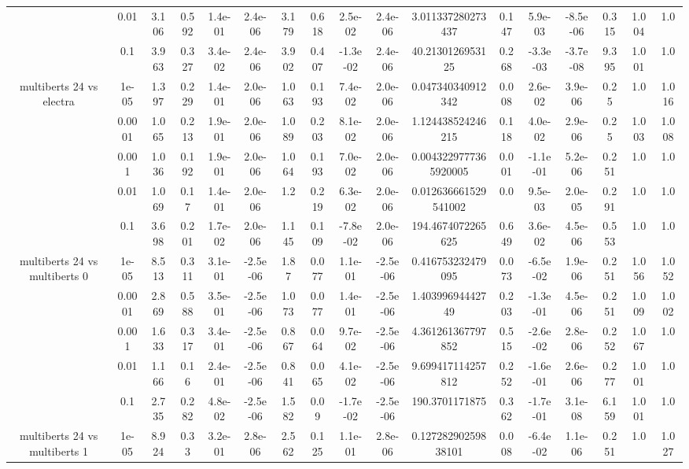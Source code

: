 \begin{tabular}{|c|c|c|c|c|c|c|c|c|c|c|c|c|c|c|c|c|}
 & 0.01 & 3.106 & 0.592 & 1.4e-01 & 2.4e-06 & 3.179 & 0.618 & 2.5e-02 & 2.4e-06 & 3.011337280273437 & 0.147 & 5.9e-03 & -8.5e-06 & 0.315 & 1.004 & 1.0 \\
 & 0.1 & 3.963 & 0.327 & 3.4e-02 & 2.4e-06 & 3.902 & 0.407 & -1.3e-02 & 2.4e-06 & 40.2130126953125 & 0.268 & -3.3e-03 & -3.7e-08 & 9.395 & 1.001 & 1.0 \\
\hline
\multirow{5}{*}{multiberts 24 vs electra } & 1e-05 & 1.397 & 0.229 & 1.4e-01 & 2.0e-06 & 1.063 & 0.193 & 7.4e-02 & 2.0e-06 & 0.047340340912342 & 0.008 & 2.6e-02 & 3.9e-06 & 0.25 & 1.0 & 1.016 \\
 & 0.0001 & 1.065 & 0.213 & 1.9e-01 & 2.0e-06 & 1.089 & 0.203 & 8.1e-02 & 2.0e-06 & 1.124438524246215 & 0.118 & 4.0e-02 & 2.9e-06 & 0.25 & 1.003 & 1.008 \\
 & 0.001 & 1.036 & 0.192 & 1.9e-01 & 2.0e-06 & 1.064 & 0.193 & 7.0e-02 & 2.0e-06 & 0.0043229777365920005 & 0.001 & -1.1e-01 & 5.2e-06 & 0.251 & 1.0 & 1.0 \\
 & 0.01 & 1.069 & 0.17 & 1.4e-01 & 2.0e-06 & 1.2 & 0.219 & 6.3e-02 & 2.0e-06 & 0.012636661529541002 & 0.0 & 9.5e-03 & 2.0e-05 & 0.291 & 1.0 & 1.0 \\
 & 0.1 & 3.698 & 0.201 & 1.7e-02 & 2.0e-06 & 1.145 & 0.109 & -7.8e-02 & 2.0e-06 & 194.4674072265625 & 0.649 & 3.6e-02 & 4.5e-06 & 0.553 & 1.0 & 1.0 \\
\hline
\multirow{5}{*}{multiberts 24 vs multiberts 0} & 1e-05 & 8.513 & 0.311 & 3.1e-01 & -2.5e-06 & 1.87 & 0.077 & 1.1e-01 & -2.5e-06 & 0.416753232479095 & 0.073 & -6.5e-02 & 1.9e-06 & 0.251 & 1.056 & 1.052 \\
 & 0.0001 & 2.869 & 0.588 & 3.5e-01 & -2.5e-06 & 1.073 & 0.077 & 1.4e-01 & -2.5e-06 & 1.40399694442749 & 0.203 & -1.3e-01 & 4.5e-06 & 0.251 & 1.009 & 1.002 \\
 & 0.001 & 1.633 & 0.317 & 3.4e-01 & -2.5e-06 & 0.867 & 0.064 & 9.7e-02 & -2.5e-06 & 4.361261367797852 & 0.515 & -2.6e-02 & 2.8e-06 & 0.252 & 1.067 & 1.0 \\
 & 0.01 & 1.166 & 0.16 & 2.4e-01 & -2.5e-06 & 0.841 & 0.065 & 4.1e-02 & -2.5e-06 & 9.699417114257812 & 0.252 & -1.6e-01 & 2.6e-06 & 0.277 & 1.001 & 1.0 \\
 & 0.1 & 2.735 & 0.282 & 4.8e-02 & -2.5e-06 & 1.582 & 0.09 & -1.7e-02 & -2.5e-06 & 190.3701171875 & 0.362 & -1.7e-01 & 3.1e-08 & 6.159 & 1.001 & 1.0 \\
\hline
\multirow{5}{*}{multiberts 24 vs multiberts 1} & 1e-05 & 8.924 & 0.33 & 3.2e-01 & 2.8e-06 & 2.562 & 0.125 & 1.1e-01 & 2.8e-06 & 0.12728290259838101 & 0.008 & -6.4e-02 & 1.1e-06 & 0.251 & 1.0 & 1.027 \\

\end{tabular}
